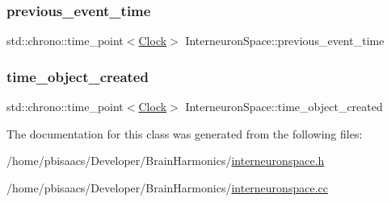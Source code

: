 \mbox{\label{classInterneuronSpace_a28efcbf608d5dd02f9dd85bec76a7650}} 
\subsubsection{\texorpdfstring{previous\+\_\+event\+\_\+time}{previous\_event\_time}}
{\footnotesize\ttfamily std\+::chrono\+::time\+\_\+point$<$\mbox{\hyperlink{universe_8h_a0ef8d951d1ca5ab3cfaf7ab4c7a6fd80}{Clock}}$>$ Interneuron\+Space\+::previous\+\_\+event\+\_\+time\hspace{0.3cm}{\ttfamily [private]}}

\mbox{\label{classInterneuronSpace_a5504d64df22fd330cdd14b4aca0171ea}} 
\subsubsection{\texorpdfstring{time\+\_\+object\+\_\+created}{time\_object\_created}}
{\footnotesize\ttfamily std\+::chrono\+::time\+\_\+point$<$\mbox{\hyperlink{universe_8h_a0ef8d951d1ca5ab3cfaf7ab4c7a6fd80}{Clock}}$>$ Interneuron\+Space\+::time\+\_\+object\+\_\+created\hspace{0.3cm}{\ttfamily [private]}}



The documentation for this class was generated from the following files\+:\begin{DoxyCompactItemize}
\item 
/home/pbisaacs/\+Developer/\+Brain\+Harmonics/\mbox{\hyperlink{interneuronspace_8h}{interneuronspace.\+h}}\item 
/home/pbisaacs/\+Developer/\+Brain\+Harmonics/\mbox{\hyperlink{interneuronspace_8cc}{interneuronspace.\+cc}}\end{DoxyCompactItemize}
